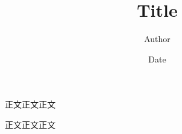 \documentclass{article}
\title{Title}
\author{Author}
\date{Date}
\begin{document}
\maketitle

正文正文正文

正文正文正文
\end{document}
